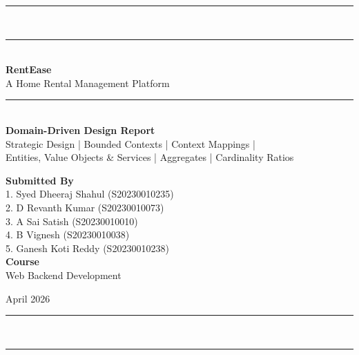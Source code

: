 \documentclass[12pt,a4paper]{article}
\begin{document}
\begin{titlepage}
  \centering
  \vspace*{1.5cm}

  {\color{primary}\rule{\linewidth}{2pt}}\\[0.4cm]
  {\color{accent}\rule{\linewidth}{0.6pt}}\\[1.2cm]

  {\Huge\bfseries\color{primary} RentEase}\\[0.5cm]
  {\Large\color{accent} A Home Rental Management Platform}\\[0.8cm]
  {\color{accent}\rule{0.4\linewidth}{0.6pt}}\\[0.8cm]

  {\large\bfseries\color{darktext}
    Domain-Driven Design Report}\\[0.3cm]
  {\normalsize\color{mutedtext}
    Strategic Design | Bounded Contexts | Context Mappings |\\[0.1cm]
    Entities, Value Objects \& Services | Aggregates | Cardinality Ratios}

  \vspace{1.5cm}

  \begin{tcolorbox}[
    enhanced, colback=ctxBlue!40!white, colframe=primary,
    arc=6pt, boxrule=1pt, width=0.75\linewidth,
    left=12pt, right=12pt, top=10pt, bottom=10pt
  ]
    \centering
    {\small\bfseries\color{primary} Submitted By}\\[6pt]
    {\normalsize\color{darktext} 1. Syed Dheeraj Shahul \quad (S20230010235)}\\[2pt]
    {\normalsize\color{darktext} 2. D Revanth Kumar \quad (S20230010073)}\\[2pt]
    {\normalsize\color{darktext} 3. A Sai Satish \quad (S20230010010)}\\[2pt]
    {\normalsize\color{darktext} 4. B Vignesh \quad (S20230010038)}\\[2pt]
    {\normalsize\color{darktext} 5. Ganesh Koti Reddy \quad (S20230010238)}\\[8pt]
    {\small\bfseries\color{primary} Course}\\[4pt]
    {\small\color{darktext} Web Backend Development}
  \end{tcolorbox}

  \vspace{1cm}
  {\small\color{mutedtext} April 2026}

  \vfill
  {\color{accent}\rule{\linewidth}{0.6pt}}\\[0.2cm]
  {\color{primary}\rule{\linewidth}{2pt}}
\end{titlepage}
\end{document}
